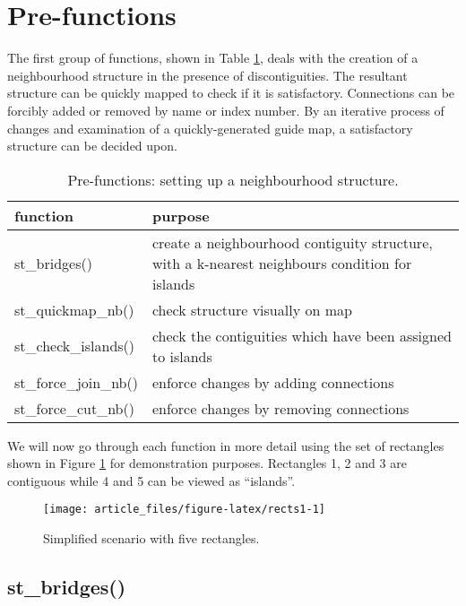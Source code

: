 \section{Pre-functions}\label{pre-functions}

The first group of functions, shown in Table \ref{tab:prefunc-latex}, deals with the creation
of a neighbourhood structure in the presence of discontiguities. The
resultant structure can be quickly mapped to check if it is
satisfactory. Connections can be forcibly added or removed by name or
index number. By an iterative process of changes and examination of a
quickly-generated guide map, a satisfactory structure can be decided upon.

\begin{table}
\centering
\caption{\label{tab:prefunc-latex}Pre-functions: setting up a neighbourhood structure.}
\centering
\fontsize{9}{11}\selectfont
\begin{tabular}[t]{l|>{\raggedright\arraybackslash}p{7cm}}
\hline
\textbf{function} & \textbf{purpose}\\
\hline
st\_bridges() & create a neighbourhood contiguity structure, with a k-nearest neighbours condition for islands\\
\hline
st\_quickmap\_nb() & check structure visually on map\\
\hline
st\_check\_islands() & check the contiguities which have been assigned to islands\\
\hline
st\_force\_join\_nb() & enforce changes by adding connections\\
\hline
st\_force\_cut\_nb() & enforce changes by removing connections\\
\hline
\end{tabular}
\end{table}

We will now go through each function in more detail using the set of rectangles shown in Figure \ref{fig:rects1} for demonstration purposes. Rectangles 1, 2 and 3 are contiguous while 4 and 5 can be viewed as ``islands''.

\begin{figure}

{\centering \texttt{[image: article\_files/figure-latex/rects1-1]} 

}

\caption{Simplified scenario with five rectangles. }\label{fig:rects1}
\end{figure}

\subsection{st\_bridges()}\label{st_bridges}

